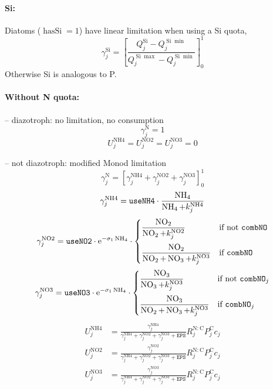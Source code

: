 \documentclass[11pt,letterpaper,english]{article}
\def\|#1|{\operatorname{#1}}
\newcommand{\ee}{\mathrm{e}}
\DeclareMathOperator{\Si}{Si}
\DeclareMathOperator{\NH}{NH}
\DeclareMathOperator{\NO}{NO}
\DeclareMathOperator{\NHiv}{NH4}
\DeclareMathOperator{\NOii}{NO2}
\DeclareMathOperator{\NOiii}{NO3}
\newcommand{\N}{\mathrm{N}}
\newcommand{\C}{\mathrm{C}}
\newcommand{\X}{c}
\newcommand{\eps}{{\mathtt{EPS}}}
\begin{document}
\paragraph{Si:} Diatoms ($\|hasSi|=1$) have linear limitation when using a Si quota,
\[
  \gamma^{\Si}_j = \left[ \frac{Q^{\Si}_j - Q^{\Si\min}_j}
                           {Q^{\Si\max}_j - Q^{\Si\min}_j}
                   \right]_0^1
\]
Otherwise Si is analogous to P.


\paragraph{Without N quota:}

-- diazotroph: no limitation, no consumption
\[
  \gamma^\N_j = 1
\]
\[
  U^{\NHiv}_j = U^{\NOii}_j = U^{\NOiii}_j = 0
\]

-- not diazotroph: modified Monod limitation
\[
  \gamma^\N_j = \left[ \gamma^{\NHiv}_j + \gamma^{\NOii}_j + \gamma^{\NOiii}_j \right]_0^1
\]
\[
  \gamma^{\NHiv}_j = \verb|useNH4| \cdot \frac{\NH_4}{\NH_4 + k^{\NHiv}_j}
\]
\[
  \gamma^{\NOii}_j = \verb|useNO2| \cdot
  \ee^{-\sigma_1 \NH_4} \cdot
  \begin{cases}
    \dfrac{\NO_2}{\NO_2 + k^{\NOii}_j} & \text{if not }\verb|combNO| \\[3ex]
    \dfrac{\NO_2}{\NO_2 + \NO_3 + k^{\NOiii}_j} & \text{if }\verb|combNO|
  \end{cases}
\]
\[
  \gamma^{\NOiii}_j = \verb|useNO3| \cdot
  \ee^{-\sigma_1 \NH_4} \cdot
  \begin{cases}
    \dfrac{\NO_3}{\NO_3 + k^{\NOiii}_j} & \text{if not }\verb|combNO|_j \\[3ex]
    \dfrac{\NO_3}{\NO_2 + \NO_3 + k^{\NOiii}_j} & \text{if }\verb|combNO|_j
  \end{cases}
\]
\begin{align}
  U^{\NHiv}_j &= \frac{\gamma^{\NHiv}_j}
                 {\gamma^{\NHiv}_j + \gamma^{\NOii}_j + \gamma^{\NOiii}_j + \eps}
                 R^{\N:\C}_j P^\C_j \X_j
  \label{eq:UNH4} \\
  U^{\NOii}_j &= \frac{\gamma^{\NOii}_j}
                 {\gamma^{\NHiv}_j + \gamma^{\NOii}_j + \gamma^{\NOiii}_j + \eps}
                 R^{\N:\C}_j P^\C_j \X_j
  \label{eq:UNO2} \\
  U^{\NOiii}_j &= \frac{\gamma^{\NOiii}_j}
                  {\gamma^{\NHiv}_j + \gamma^{\NOii}_j + \gamma^{\NOiii}_j + \eps}
                  R^{\N:\C}_j P^\C_j \X_j
  \label{eq:UNO3}
\end{align}
\end{document}
